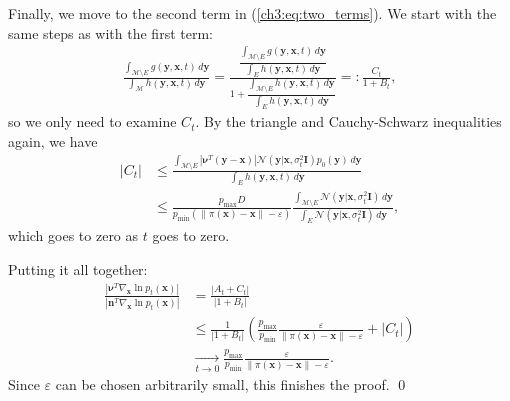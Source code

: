 Finally, we move to the second term in (\ref{ch3:eq:two_terms}). We start with the same steps as with the first term:
\begin{gather*}
    \frac{\int_{\mathcal{M} \setminus E} g(\textbf{y}, \textbf{x}, t)\, d\textbf{y}}{\int_\mathcal{M} h(\textbf{y}, \textbf{x}, t)\, d\textbf{y}}
    = \frac{ \dfrac{\int_{\mathcal{M} \setminus E} g(\textbf{y}, \textbf{x}, t)\, d\textbf{y}}{\int_{E} h(\textbf{y}, \textbf{x}, t)\, d\textbf{y}}  }{1 + \dfrac{ \int_{\mathcal{M} \setminus E} h(\textbf{y}, \textbf{x}, t)\, d\textbf{y}}{\int_{E} h(\textbf{y}, \textbf{x}, t)\, d\textbf{y}} } 
    =: \frac{C_t}{1 + B_t},
\end{gather*}
so we only need to examine $C_t$. By the triangle and Cauchy-Schwarz inequalities again, we have
\begin{align*}
    |C_t| &\leq \frac{\int_{\mathcal{M} \setminus E} |\boldsymbol{\nu}^T (\textbf{y}-\textbf{x})| \mathcal{N}(\textbf{y} | \textbf{x}, \sigma^2_t \textbf{I}) p_0(\textbf{y})\, d\textbf{y}}{\int_{E} h(\textbf{y}, \textbf{x}, t)\, d\textbf{y}} \\
    &\leq \frac{ p_\text{max} D}{ p_\text{min} (\|\pi(\textbf{x}) - \textbf{x}\| - \varepsilon)} \frac{\int_{\mathcal{M} \setminus E}  \mathcal{N}(\textbf{y} | \textbf{x}, \sigma^2_t \textbf{I})\, d\textbf{y}}{\int_{E} \mathcal{N}(\textbf{y} | \textbf{x}, \sigma^2_t \textbf{I})\, d\textbf{y}},
\end{align*}
which goes to zero as $t$ goes to zero.

Putting it all together:
\begin{align*}
    \frac{|\boldsymbol{\nu}^T \nabla_\textbf{x} \ln p_t(\textbf{x})|}{|\textbf{n}^T \nabla_\textbf{x} \ln p_t(\textbf{x})|} 
    &= \frac{|A_t + C_t|}{|1 + B_t|} \\
      &\leq \frac{1}{|1 + B_t|} \left(  \frac{p_\text{max}}{p_\text{min}} \frac{ \varepsilon}{\|\pi(\textbf{x}) - \textbf{x}\| - \varepsilon } + |C_t| \right) \\
      &\xrightarrow[t \to 0]{} \frac{p_\text{max}}{p_\text{min}} \frac{ \varepsilon}{\|\pi(\textbf{x}) - \textbf{x}\| - \varepsilon }.
\end{align*}
Since $\varepsilon$ can be chosen arbitrarily small, this finishes the proof. \qed

